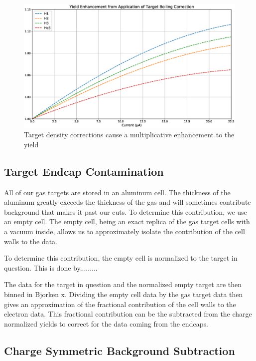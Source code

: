 \begin{figure}
	\includegraphics[width=\textwidth]{./analysis/fig/boil_yield_cor.eps}
	\caption{Target density corrections cause a multiplicative enhancement to the yield}
	\label{fig:boilyieldcor}
\end{figure}

\subsection{Target Endcap Contamination}
\label{sec:ecc}

All of our gas targets are stored in an aluminum cell. The thickness of the aluminum greatly exceeds the thickness of the gas and will sometimes contribute background that makes it past our cuts. To determine this contribution, we use an empty cell. The empty cell, being an exact replica of the gas target cells with a vacuum inside, allows us to approximately isolate the contribution of the cell walls to the data.

To determine this contribution, the empty cell is normalized to the target in question. This is done by.........

The data for the target in question and the normalized empty target are then binned in Bjorken x. Dividing the empty cell data by the gas target data then gives an approximation of the fractional contribution of the cell walls to the electron data. This fractional contribution can be the subtracted from the charge normalized yields to correct for the data coming from the endcaps.

\subsection{Charge Symmetric Background Subtraction}

